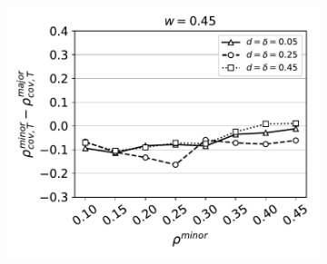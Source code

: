 \documentclass[11pt,letterpaper]{article}
\begin{document}
\begin{figure}[H]
\begin{subfigure}{0.31\textwidth}
    \caption{}
  \end{subfigure}
  \begin{subfigure}{0.31\textwidth}
    \includegraphics[width=\textwidth]{Figures/minority-homophily=0p45.pdf}
    \caption{}
  \end{subfigure}
  \caption{}
\end{figure}
\end{document}
